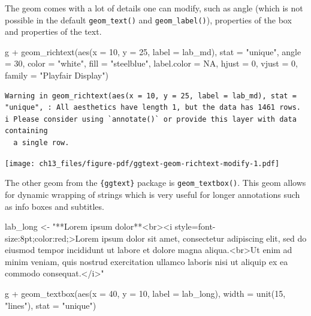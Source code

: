 \documentclass[
  letterpaper,
]{scrbook}
\newenvironment{Shaded}{\begin{snugshade}}{\end{snugshade}}
\newcommand{\AttributeTok}[1]{\textcolor[rgb]{0.40,0.45,0.13}{#1}}
\newcommand{\ConstantTok}[1]{\textcolor[rgb]{0.56,0.35,0.01}{#1}}
\newcommand{\DecValTok}[1]{\textcolor[rgb]{0.68,0.00,0.00}{#1}}
\newcommand{\FunctionTok}[1]{\textcolor[rgb]{0.28,0.35,0.67}{#1}}
\newcommand{\NormalTok}[1]{\textcolor[rgb]{0.00,0.23,0.31}{#1}}
\newcommand{\OtherTok}[1]{\textcolor[rgb]{0.00,0.23,0.31}{#1}}
\newcommand{\SpecialCharTok}[1]{\textcolor[rgb]{0.37,0.37,0.37}{#1}}
\newcommand{\StringTok}[1]{\textcolor[rgb]{0.13,0.47,0.30}{#1}}
\begin{document}
The geom comes with a lot of details one can modify, such as angle
(which is not possible in the default \texttt{geom\_text()} and
\texttt{geom\_label()}), properties of the box and properties of the
text.

\begin{Shaded}
\begin{Highlighting}[]
\NormalTok{g }\SpecialCharTok{+}
  \FunctionTok{geom\_richtext}\NormalTok{(}\FunctionTok{aes}\NormalTok{(}\AttributeTok{x =} \DecValTok{10}\NormalTok{, }\AttributeTok{y =} \DecValTok{25}\NormalTok{, }\AttributeTok{label =}\NormalTok{ lab\_md),}
                \AttributeTok{stat =} \StringTok{"unique"}\NormalTok{, }\AttributeTok{angle =} \DecValTok{30}\NormalTok{,}
                \AttributeTok{color =} \StringTok{"white"}\NormalTok{, }\AttributeTok{fill =} \StringTok{"steelblue"}\NormalTok{,}
                \AttributeTok{label.color =} \ConstantTok{NA}\NormalTok{, }\AttributeTok{hjust =} \DecValTok{0}\NormalTok{, }\AttributeTok{vjust =} \DecValTok{0}\NormalTok{,}
                \AttributeTok{family =} \StringTok{"Playfair Display"}\NormalTok{)}
\end{Highlighting}
\end{Shaded}

\begin{verbatim}
Warning in geom_richtext(aes(x = 10, y = 25, label = lab_md), stat = "unique", : All aesthetics have length 1, but the data has 1461 rows.
i Please consider using `annotate()` or provide this layer with data containing
  a single row.
\end{verbatim}

\texttt{[image: ch13\_files/figure-pdf/ggtext-geom-richtext-modify-1.pdf]}

The other geom from the \texttt{\{ggtext\}} package is
\texttt{geom\_textbox()}. This geom allows for dynamic wrapping of
strings which is very useful for longer annotations such as info boxes
and subtitles.

\begin{Shaded}
\begin{Highlighting}[]
\NormalTok{lab\_long }\OtherTok{\textless{}{-}} \StringTok{"**Lorem ipsum dolor**\textless{}br\textgreater{}\textless{}i style=\textquotesingle{}font{-}size:8pt;color:red;\textquotesingle{}\textgreater{}Lorem ipsum dolor sit amet, consectetur adipiscing elit, sed do eiusmod tempor incididunt ut labore et dolore magna aliqua.\textless{}br\textgreater{}Ut enim ad minim veniam, quis nostrud exercitation ullamco laboris nisi ut aliquip ex ea commodo consequat.\textless{}/i\textgreater{}"}

\NormalTok{g }\SpecialCharTok{+}
  \FunctionTok{geom\_textbox}\NormalTok{(}\FunctionTok{aes}\NormalTok{(}\AttributeTok{x =} \DecValTok{40}\NormalTok{, }\AttributeTok{y =} \DecValTok{10}\NormalTok{, }\AttributeTok{label =}\NormalTok{ lab\_long),}
               \AttributeTok{width =} \FunctionTok{unit}\NormalTok{(}\DecValTok{15}\NormalTok{, }\StringTok{"lines"}\NormalTok{), }\AttributeTok{stat =} \StringTok{"unique"}\NormalTok{)}
\end{Highlighting}
\end{Shaded}
\end{document}
